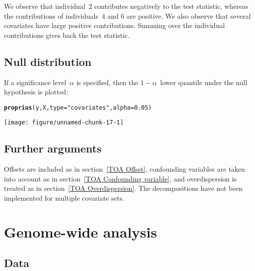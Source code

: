 \documentclass{article}\usepackage[]{graphicx}\usepackage[]{color}
\makeatletter
\def\maxwidth{ %
  \ifdim\Gin@nat@width>\linewidth
    \linewidth
  \else
    \Gin@nat@width
  \fi
}
\newcommand{\hlnum}[1]{\textcolor[rgb]{0.686,0.059,0.569}{#1}}%
\newcommand{\hlstr}[1]{\textcolor[rgb]{0.192,0.494,0.8}{#1}}%
\newcommand{\hlstd}[1]{\textcolor[rgb]{0.345,0.345,0.345}{#1}}%
\newcommand{\hlkwc}[1]{\textcolor[rgb]{0.333,0.667,0.333}{#1}}%
\newcommand{\hlkwd}[1]{\textcolor[rgb]{0.737,0.353,0.396}{\textbf{#1}}}%
\newenvironment{kframe}{%
 \def\at@end@of@kframe{}%
 \ifinner\ifhmode%
  \def\at@end@of@kframe{\end{minipage}}%
  \begin{minipage}{\columnwidth}%
 \fi\fi%
 \def\FrameCommand##1{\hskip\@totalleftmargin \hskip-\fboxsep
 \colorbox{shadecolor}{##1}\hskip-\fboxsep
     \hskip-\linewidth \hskip-\@totalleftmargin \hskip\columnwidth}%
 \MakeFramed {\advance\hsize-\width
   \@totalleftmargin\z@ \linewidth\hsize
   \@setminipage}}%
 {\par\unskip\endMakeFramed%
 \at@end@of@kframe}
\newenvironment{knitrout}{}{} %
\makeatother
\begin{document}
We observe that individual~$2$ contributes negatively to the test statistic, whereas the contributions of individuals~$4$ and $6$ are positive. We also observe that several covariates have large positive contributions. Summing over the individual contributions gives back the test statistic.


\subsection{Null distribution}
\label{DCN Null distribution}

If a significance level~$\alpha$ is specified, then the \mbox{$1-\alpha$}~lower quantile under the null hypothesis is plotted:
\begin{knitrout}
\color{fgcolor}\begin{kframe}
\begin{alltt}
\hlkwd{proprius}\hlstd{(y,X,}\hlkwc{type}\hlstd{=}\hlstr{"covariates"}\hlstd{,}\hlkwc{alpha}\hlstd{=}\hlnum{0.05}\hlstd{)}
\end{alltt}
\end{kframe}
\texttt{[image: figure/unnamed-chunk-17-1]} 

\end{knitrout}

\subsection{Further arguments}
\label{DCN Further arguments}

Offsets are included as in section~\ref{TOA Offset}, confounding variables are taken into account as in section~\ref{TOA Confounding variable}, and overdispersion is treated as in section~\ref{TOA Overdispersion}. The decompositions have not been implemented for multiple covariate sets.

\newpage %
\section{Genome-wide analysis} %
\label{GWA} %

\subsection{Data}
\label{GWA Data}
\end{document}
